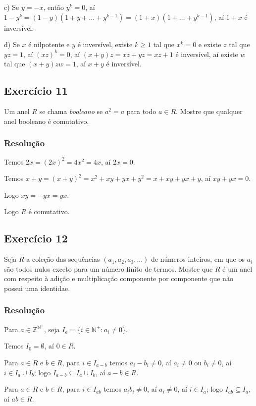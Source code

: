 \documentclass[10pt,a4paper]{article}
\begin{document}
\medskip
\noindent
c) Se $y=-x$, então $y^k=0$, aí $1-y^k=(1-y)(1+y+\dots+y^{k-1})=(1+x)(1+\dots+y^{k-1})$, aí $1+x$ é inversível.

\medskip
\noindent
d) Se $x$ é nilpotente e $y$ é inversível, existe $k\geq 1$ tal que $x^k=0$ e existe $z$ tal que $yz=1$, aí $(xz)^k=0$, aí $(x+y)z=xz+yz=xz+1$ é inversível, aí existe $w$ tal que $(x+y)zw=1$, aí $x+y$ é inversível.

\subsection*{Exercício 11}

Um anel $R$ se chama \textit{booleano} se $a^2=a$ para todo $a\in R$. Mostre que qualquer anel booleano é comutativo.

\subsubsection*{Resolução}

Temos $2x=(2x)^2=4x^2=4x$, aí $2x=0$.

\medskip
\noindent
Temos $x+y=(x+y)^2=x^2+xy+yx+y^2=x+xy+yx+y$, aí $xy+yx=0$.

\medskip
\noindent
Logo $xy=-yx=yx$.

\medskip
\noindent
Logo $R$ é comutativo.

\subsection*{Exercício 12}
Seja $R$ a coleção das sequências $(a_1,a_2,a_3,\dots)$ de números inteiros, em que os $a_i$ são todos nulos exceto para um número finito de termos. Mostre que $R$ é um anel com respeito à adição e multiplicação componente por componente que não possui uma identidae.

\subsubsection*{Resolução}

Para $a\in\mathbb{Z}^{\mathbb{N}^+}$, seja $I_a=\{i\in\mathbb{N}^+:a_i\neq0\}$.

\medskip
\noindent
Temos $I_0=\emptyset$, aí $0\in R$.

\medskip
\noindent
Para $a\in R$ e $b\in R$, para $i\in I_{a-b}$ temos $a_i-b_i\neq 0$, aí $a_i\neq 0$ ou $b_i\neq 0$, aí $i\in I_a\cup I_b$; logo $I_{a-b}\subseteq I_a\cup I_b$, aí $a-b\in R$.

\medskip
\noindent
Para $a\in R$ e $b\in R$, para $i\in I_{ab}$ temos $a_ib_i\neq 0$, aí $a_i\neq 0$, aí $i\in I_a$; logo $I_{ab}\subseteq I_a$, aí $ab\in R$.
\end{document}

